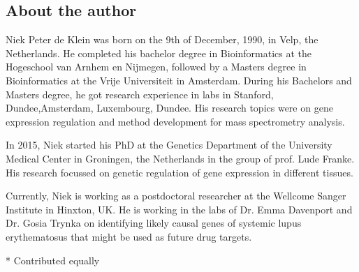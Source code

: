 \begin{appendices}
\chapter{About the author}

Niek Peter de Klein was born on the 9th of December, 1990, in Velp, the Netherlands. He completed his bachelor degree in Bioinformatics at the Hogeschool van Arnhem en Nijmegen, followed by a Masters degree in Bioinformatics at the Vrije Universiteit in Amsterdam. During his Bachelors and Masters degree, he got research experience in labs in Stanford, Dundee,Amsterdam, Luxembourg, Dundee. His research topics were on gene expression regulation and method development for mass spectrometry analysis.  

In 2015, Niek started his PhD at the Genetics Department of the University Medical Center in Groningen, the Netherlands in the group of prof. Lude Franke. His research focussed on genetic regulation of gene expression in different tissues. 


Currently, Niek is working as a postdoctoral researcher at the Wellcome Sanger Institute in Hinxton, UK. He is working in the labs of Dr. Emma Davenport and Dr. Gosia Trynka on identifying likely causal genes of systemic lupus erythematosus that might be used as future drug targets.



\renewcommand{\bibsection}{\section*{List of Publications}}
\nocite{*}




* Contributed equally

\end{appendices}
